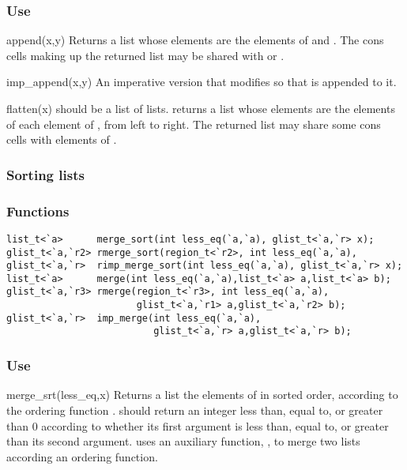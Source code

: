 \subsubsection*{Use}

\begin{defun}{append}{(x,y)}
Returns a list whose elements are the elements of  and .
The cons cells making up the returned list may be shared with  or
.
\end{defun}

\begin{defun}{imp_append}{(x,y)}
An imperative version that modifies  so that  is
appended to it.
\end{defun}

\begin{defun}{flatten}{(x)}
 should be a list of lists.   returns a list whose
elements are the elements of each element of , from left to
right.  The returned list may share some cons cells with elements of
.
\end{defun}

\subsubsection*{Sorting lists}
\subsubsection*{Functions}
\begin{verbatim}
list_t<`a>      merge_sort(int less_eq(`a,`a), glist_t<`a,`r> x);
glist_t<`a,`r2> rmerge_sort(region_t<`r2>, int less_eq(`a,`a), 
glist_t<`a,`r>  rimp_merge_sort(int less_eq(`a,`a), glist_t<`a,`r> x);
list_t<`a>      merge(int less_eq(`a,`a),list_t<`a> a,list_t<`a> b);
glist_t<`a,`r3> rmerge(region_t<`r3>, int less_eq(`a,`a),
                       glist_t<`a,`r1> a,glist_t<`a,`r2> b);
glist_t<`a,`r>  imp_merge(int less_eq(`a,`a),
                          glist_t<`a,`r> a,glist_t<`a,`r> b);
\end{verbatim}

\subsubsection*{Use}

\begin{defun}{merge_srt}{(less_eq,x)}
Returns a list the elements of  in sorted order, according to the
ordering function .   should return an integer
less than, equal to, or greater than 0 according to whether its first
argument is less than, equal to, or greater than its second argument.
 uses an auxiliary function,
, to merge two lists
according an ordering function.
\end{defun}

